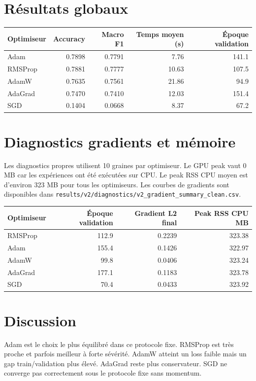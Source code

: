 \documentclass[11pt,a4paper]{article}
\begin{document}
\section{Résultats globaux}
\begin{longtable}{lrrrr}
\toprule
Optimiseur & Accuracy & Macro F1 & Temps moyen (s) & Époque validation\\
\midrule
Adam & 0.7898 & 0.7791 & 7.76 & 141.1\\
RMSProp & 0.7881 & 0.7777 & 10.63 & 107.5\\
AdamW & 0.7635 & 0.7561 & 21.86 & 94.9\\
AdaGrad & 0.7470 & 0.7410 & 12.03 & 151.4\\
SGD & 0.1404 & 0.0668 & 8.37 & 67.2\\
\bottomrule
\end{longtable}

\section{Diagnostics gradients et mémoire}
Les diagnostics propres utilisent 10 graines par optimiseur. Le GPU peak vaut 0 MB car les expériences ont été exécutées sur CPU. Le peak RSS CPU moyen est d'environ 323 MB pour tous les optimiseurs. Les courbes de gradients sont disponibles dans \texttt{results/v2/diagnostics/v2\_gradient\_summary\_clean.csv}.

\begin{longtable}{lrrr}
\toprule
Optimiseur & Époque validation & Gradient L2 final & Peak RSS CPU MB\\
\midrule
RMSProp & 112.9 & 0.2239 & 323.38\\
Adam & 155.4 & 0.1426 & 322.97\\
AdamW & 99.8 & 0.0406 & 323.24\\
AdaGrad & 177.1 & 0.1183 & 323.78\\
SGD & 70.4 & 0.0433 & 323.92\\
\bottomrule
\end{longtable}

\section{Discussion}
Adam est le choix le plus équilibré dans ce protocole fixe. RMSProp est très proche et parfois meilleur à forte sévérité. AdamW atteint un loss faible mais un gap train/validation plus élevé. AdaGrad reste plus conservateur. SGD ne converge pas correctement sous le protocole fixe sans momentum.
\end{document}
